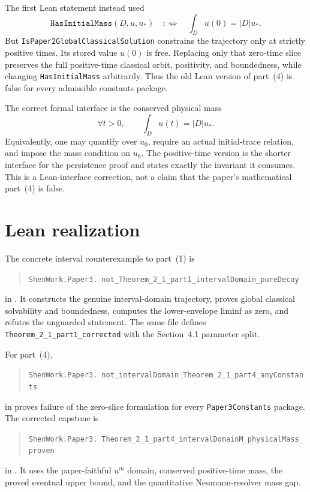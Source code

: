 \documentclass[11pt]{article}
\begin{document}
The first Lean statement instead used
\[
  \texttt{HasInitialMass}(D,u,u_*)
  \quad:\Longleftrightarrow\quad
  \int_D u(0)=|D|u_*.
\]
But \texttt{IsPaper2GlobalClassicalSolution} constrains the trajectory only at
strictly positive times.  Its stored value $u(0)$ is free.  Replacing only that
zero-time slice preserves the full positive-time classical orbit, positivity,
and boundedness, while changing \texttt{HasInitialMass} arbitrarily.  Thus the
old Lean version of part~(4) is false for every admissible constants package.

The correct formal interface is the conserved physical mass
\[
  \forall t>0,\qquad \int_D u(t)=|D|u_*.
\]
Equivalently, one may quantify over $u_0$, require an actual initial-trace
relation, and impose the mass condition on $u_0$.  The positive-time version is
the shorter interface for the persistence proof and states exactly the
invariant it consumes.  This is a Lean-interface correction, not a claim that
the paper's mathematical part~(4) is false.

\section{Lean realization}

The concrete interval counterexample to part~(1) is
\begin{quote}
\texttt{ShenWork.Paper3.}\
\texttt{not\_Theorem\_2\_1\_part1\_intervalDomain\_pureDecay}
\end{quote}
in
.
It constructs the genuine interval-domain trajectory, proves global classical
solvability and boundedness, computes the lower-envelope liminf as zero, and
refutes the unguarded statement.  The same file defines
\texttt{Theorem\_2\_1\_part1\_corrected} with the Section~4.1 parameter split.

For part~(4),
\begin{quote}
\texttt{ShenWork.Paper3.}\
\texttt{not\_intervalDomain\_Theorem\_2\_1\_part4\_anyConstants}
\end{quote}
in
proves failure of the zero-slice formulation for every
\texttt{Paper3Constants} package.  The corrected capstone is
\begin{quote}
\texttt{ShenWork.Paper3.}\
\texttt{Theorem\_2\_1\_part4\_intervalDomainM\_physicalMass\_proven}
\end{quote}
in
.
It uses the paper-faithful $u^m$ domain, conserved positive-time mass, the
proved eventual upper bound, and the quantitative Neumann-resolver mass gap.
\end{document}
